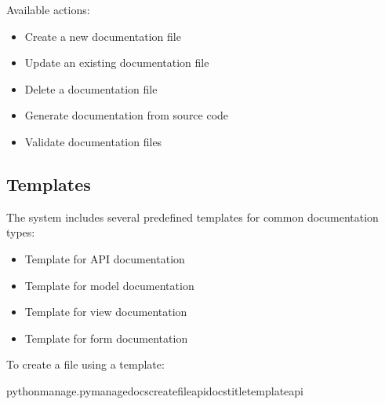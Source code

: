 \documentclass[letterpaper,10pt,english]{sphinxmanual}
\begin{document}
\sphinxAtStartPar
Available actions:
\begin{itemize}
\item {} 
\sphinxAtStartPar
{} \sphinxhyphen{} Create a new documentation file

\item {} 
\sphinxAtStartPar
{} \sphinxhyphen{} Update an existing documentation file

\item {} 
\sphinxAtStartPar
{} \sphinxhyphen{} Delete a documentation file

\item {} 
\sphinxAtStartPar
{} \sphinxhyphen{} Generate documentation from source code

\item {} 
\sphinxAtStartPar
{} \sphinxhyphen{} Validate documentation files

\end{itemize}


\subsection{Templates}
\label{\detokenize{documentation_tools:templates}}
\sphinxAtStartPar
The system includes several pre\sphinxhyphen{}defined templates for common documentation types:
\begin{itemize}
\item {} 
\sphinxAtStartPar
{} \sphinxhyphen{} Template for API documentation

\item {} 
\sphinxAtStartPar
{} \sphinxhyphen{} Template for model documentation

\item {} 
\sphinxAtStartPar
{} \sphinxhyphen{} Template for view documentation

\item {} 
\sphinxAtStartPar
{} \sphinxhyphen{} Template for form documentation

\end{itemize}

\sphinxAtStartPar
To create a file using a template:

\begin{sphinxVerbatim}[commandchars=\\\{\}]
pythonmanage.pymanage\PYGZus{}docscreate\PYGZhy{}\PYGZhy{}fileapi\PYGZus{}docs\PYGZhy{}\PYGZhy{}title\PYGZhy{}\PYGZhy{}templateapi
\end{sphinxVerbatim}
\end{document}
